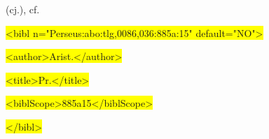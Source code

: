 \documentclass[10pt]{article}
\begin{document}
\begin{adjustwidth}{0.85in}{0.0in}
 (cj.), cf.\par

\end{adjustwidth}

\begin{adjustwidth}{0.85in}{0.0in}
 \colorbox{Yellow}{<bibl n="Perseus:abo:tlg,0086,036:885a:15" default="NO">}\par

\end{adjustwidth}

\begin{adjustwidth}{0.99in}{0.0in}
 \colorbox{Yellow}{<author>Arist.</author>}\par

\end{adjustwidth}

\begin{adjustwidth}{0.99in}{0.0in}
 \colorbox{Yellow}{<title>Pr.</title>}\par

\end{adjustwidth}

\begin{adjustwidth}{0.99in}{0.0in}
 \colorbox{Yellow}{<biblScope>885a15</biblScope>}\par

\end{adjustwidth}

\begin{adjustwidth}{0.85in}{0.0in}
 \colorbox{Yellow}{</bibl>}\par

\end{adjustwidth}























\setlength{\parskip}{15.0pt}

\printbibliography
\end{document}
